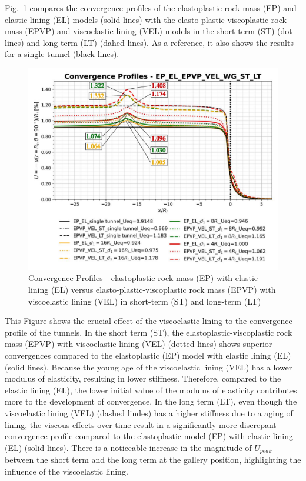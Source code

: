 \documentclass[a4paper,fleqn]{cas-sc}
\begin{document}
Fig.~\ref{EP-EL-EPVP-VEL-WG-ST-LT} compares the convergence profiles of the elastoplastic rock mass (EP) and elastic lining (EL) models (solid lines) with the elasto-plastic-viscoplastic rock mass (EPVP) and viscoelastic lining (VEL) models in the short-term (ST) (dot lines) and long-term (LT) (dahed lines). As a reference, it also shows the results for a single tunnel (black lines).
\begin{figure}[h!]
	\centering
	\includegraphics[scale=0.6]{Convergence Profiles - EP_EL_EPVP_VEL_WG_ST_LT.pdf}
	\caption{Convergence Profiles - elastoplastic rock mass (EP) with elastic lining (EL) versus elasto-plastic-viscoplastic rock mass (EPVP) with viscoelastic lining (VEL) in short-term (ST) and long-term (LT)}
	\label{EP-EL-EPVP-VEL-WG-ST-LT}
\end{figure}
\FloatBarrier
This Figure shows the crucial effect of the viscoelastic lining to the convergence profile of the tunnels. In the short term (ST), the elastoplastic-viscoplastic rock mass (EPVP) with viscoelastic lining (VEL) (dotted lines) shows superior convergences compared to the elastoplastic (EP) model with elastic lining (EL) (solid lines). Because the young age of the viscoelastic lining (VEL) has a lower modulus of elasticity, resulting in lower stiffness. Therefore, compared to the elastic lining (EL), the lower initial value of the modulus of elasticity contributes more to the development of convergence. In the long term (LT), even though the viscoelastic lining (VEL) (dashed lindes) has a higher stiffness due to a aging of lining, the viscous effects over time result in a significantly more discrepant convergence profile compared to the elastoplastic model (EP) with elastic lining (EL) (solid lines). There is a noticeable increase in the magnitude of $U_{peak}$ between the short term and the long term at the gallery position, highlighting the influence of the viscoelastic lining.
\end{document}
